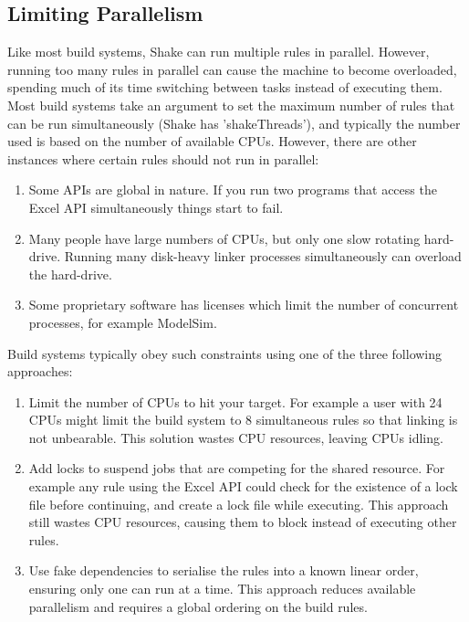 \subsection{Limiting Parallelism}

Like most build systems, Shake can run multiple rules in parallel. However, running too many rules in parallel can cause the machine to become overloaded, spending much of its time switching between tasks instead of executing them. Most build systems take an argument to set the maximum number of rules that can be run simultaneously (Shake has \lst'shakeThreads'), and typically the number used is based on the number of available CPUs. However, there are other instances where certain rules should not run in parallel:

\begin{enumerate}
\item Some APIs are global in nature. If you run two programs that access the Excel API simultaneously things start to fail.
\item Many people have large numbers of CPUs, but only one slow rotating hard-drive. Running many disk-heavy linker processes simultaneously can overload the hard-drive.
\item Some proprietary software has licenses which limit the number of concurrent processes, for example ModelSim.
\end{enumerate}

Build systems typically obey such constraints using one of the three following approaches:

\begin{enumerate}
\item Limit the number of CPUs to hit your target. For example a user with 24 CPUs might limit the build system to 8 simultaneous rules so that linking is not unbearable. This solution wastes CPU resources, leaving CPUs idling.
\item Add locks to suspend jobs that are competing for the shared resource. For example any rule using the Excel API could check for the existence of a lock file before continuing, and create a lock file while executing. This approach still wastes CPU resources, causing them to block instead of executing other rules.
\item Use fake dependencies to serialise the rules into a known linear order, ensuring only one can run at a time. This approach reduces available parallelism and requires a global ordering on the build rules.
\end{enumerate}

